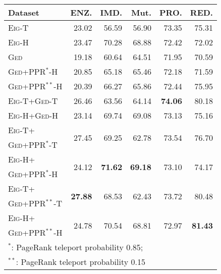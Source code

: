 \begin{tabular}{lrrrrr}
\toprule
Dataset &  ENZ. &  IMD. &  Mut. &  PRO. &  RED. \\
\midrule
\textsc{Eig}-T                           &    23.02 &        56.59 &         56.90 &     73.35 &          75.31 \\
\textsc{Eig}-H                           &    23.47 &        70.28 &         68.88 &     72.42 &          72.02 \\ \midrule
\textsc{Ged}                             &    19.18 &        60.64 &         64.51 &     71.95 &          70.59 \\
\textsc{Ged+PPR}$^*$-H                   &    20.85 &        65.18 &         65.46 &     72.18 &          71.59 \\
\textsc{Ged+PPR}$^{**}$-H                &    20.39 &        66.27 &         65.86 &     72.44 &          75.95 \\\midrule
\textsc{Eig}-T+\textsc{Ged}-T            &    26.46 &        63.56 &         64.14 &\textbf{74.06} &      80.18 \\
\textsc{Eig}-H+\textsc{Ged}-H            &    23.14 &        69.74 &         69.08 &     73.13 &          75.16 \\\midrule
\textsc{Eig}-T+ & \multirow{2}{*}{27.45} & \multirow{2}{*}{69.25} & \multirow{2}{*}{62.78} &\multirow{2}{*}{73.54} &\multirow{2}{*}{76.70}\\
\textsc{Ged+PPR}$^*$-T\\
\addlinespace[3pt]
\textsc{Eig}-H+    &\multirow{2}{*}{24.12} &\multirow{2}{*}{\textbf{71.62}}&\multirow{2}{*}{\textbf{69.18}}& \multirow{2}{*}{73.10} &\multirow{2}{*}{74.17} \\
\textsc{Ged+PPR}$^*$-H\\
\addlinespace[3pt]
\textsc{Eig}-T+ &\multirow{2}{*}{\textbf{27.88}} &\multirow{2}{*}{68.53} &\multirow{2}{*}{62.43} &\multirow{2}{*}{73.72}&\multirow{2}{*}{80.48} \\
\textsc{Ged+PPR}$^{**}$-T\\
\addlinespace[3pt]
\textsc{Eig}-H+ &\multirow{2}{*}{24.78}&\multirow{2}{*}{70.54}&\multirow{2}{*}{68.81}&\multirow{2}{*}{72.97}&\multirow{2}{*}{\textbf{81.43}}\\
\textsc{Ged+PPR}$^{**}$-H\\
\bottomrule
\multicolumn{6}{l}{$^*$: PageRank teleport probability 0.85;}\\
\multicolumn{6}{l}{$^{**}$: PageRank teleport probability 0.15}
\end{tabular}
